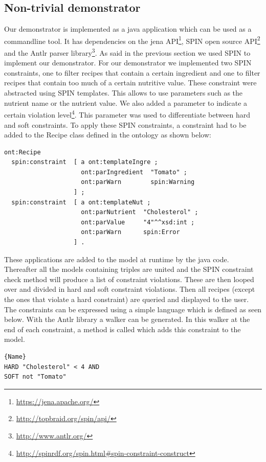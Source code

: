 \subsection{Non-trivial demonstrator}
Our demonstrator is implemented as a java application which can be used as a commandline tool. It has dependencies on the jena API\footnote{\url{https://jena.apache.org/}}, SPIN open source API\footnote{\url{http://topbraid.org/spin/api/}} and the Antlr parser library\footnote{\url{http://www.antlr.org/}}. As said in the previous section we used SPIN to implement our demonstrator. For our demonstrator we implemented two SPIN constraints, one to filter recipes that contain a certain ingredient and one to filter recipes that contain too much of a certain nutritive value. These constraint were abstracted using SPIN templates. This allows to use parameters such as the nutrient name or the nutrient value. We also added a parameter to indicate a certain violation level\footnote{\url{http://spinrdf.org/spin.html\#spin-constraint-construct}}. This parameter was used to differentiate between hard and soft constraints. To apply these SPIN constraints, a constraint had to be added to the Recipe class defined in the ontology as shown below:
\begin{lstlisting}[caption=Example of applying constraints in turtle]
ont:Recipe  
  spin:constraint  [ a ont:templateIngre ;
                     ont:parIngredient  "Tomato" ;
                     ont:parWarn        spin:Warning
                   ] ;
  spin:constraint  [ a ont:templateNut ;
                     ont:parNutrient  "Cholesterol" ;
                     ont:parValue     "4"^^xsd:int ;
                     ont:parWarn      spin:Error
                   ] .
\end{lstlisting} 
These applications are added to the model at runtime by the java code. Thereafter all the models containing triples are united and the SPIN constraint check method will produce a list of constraint violations. These are then looped over and divided in hard and soft constraint violations. Then all recipes (except the ones that violate a hard constraint) are queried and displayed to the user.\\
The constraints can be expressed using a simple language which is defined as seen below. With the Antlr library a walker can be generated. In this walker at the end of each constraint, a method is called which adds this constraint to the model. 
\begin{lstlisting}[caption=Example of the constraints file]{Name}
HARD "Cholesterol" < 4 AND
SOFT not "Tomato" 
\end{lstlisting}
